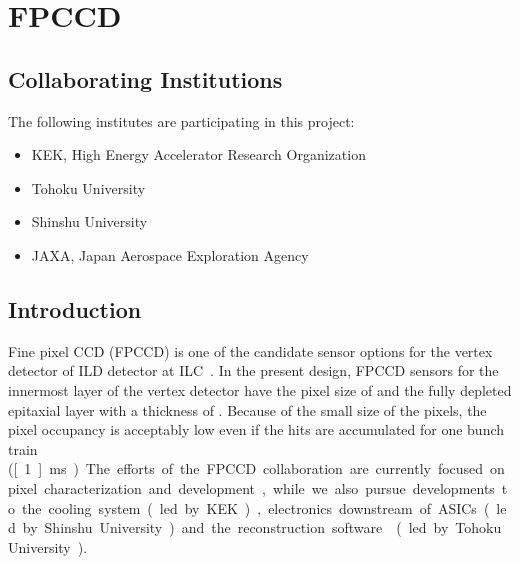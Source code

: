 \section{FPCCD}
\subsection{Collaborating Institutions}
The following institutes are participating in this project:
\begin{itemize}
    \item KEK, High Energy Accelerator Research Organization
    \item Tohoku University
    \item Shinshu University
    \item JAXA, Japan Aerospace Exploration Agency
\end{itemize}
\subsection{Introduction}
    Fine pixel CCD (FPCCD) is one of the candidate sensor options for the vertex detector of ILD detector at ILC~\cite{Sugimoto:2005ru,2009arXiv0902.2067S,2012arXiv1202.5832S}. In the present design, FPCCD sensors for the innermost layer of the vertex detector have the pixel size of \unit[5]{\micron} and the fully depleted epitaxial layer with a thickness of \unit[15]{\micron}. Because of the small size of the pixels, the pixel occupancy is acceptably low even if the hits are accumulated for one bunch train (\unit[~1]{ms}). 
    The efforts of the FPCCD collaboration are currently focused on pixel characterization and development, while we also pursue developments to the cooling system (led by KEK), electronics downstream of ASICs (led by Shinshu University) and the reconstruction software~\cite{Mori:2014xta} (led by Tohoku University).
